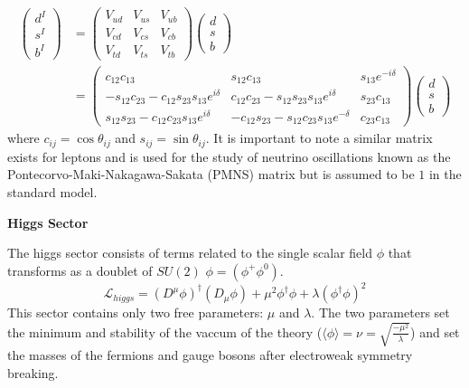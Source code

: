 \begin{align*}
\begin{pmatrix}  d^I \\ s^I \\ b^I \end{pmatrix} &=
 \begin{pmatrix} V_{ud} & V_{us} & V_{ub} \\ V_{cd} & V_{cs} & V_{cb} \\ V_{td} & V_{ts} & V_{tb} \end{pmatrix} 
\begin{pmatrix}  d \\ s \\ b \end{pmatrix}  \\
&= \begin{pmatrix} c_{12}c_{13} & s_{12} c_{13} & s_{13} e^{-i\delta} \\ 
-s_{12}c_{23} - c_{12}s_{23}s_{13}e^{i\delta} & c_{12} c_{23} - s_{12} s_{23} s_{13} e^{i\delta} & s_{23} c_{13} \\
s_{12}s_{23} - c_{12} c_{23} s_{13} e^{i\delta} & -c_{12}s_{23}-s_{12}c_{23}s_{13}e^{-\delta} & c_{23}c_{13}  \end{pmatrix} 
\begin{pmatrix}  d \\ s \\ b \end{pmatrix} 
\end{align*}
where $c_{ij} = \cos \theta_{ij}$ and $s_{ij} = \sin \theta_{ij}$. It is important to note a similar matrix exists for leptons
and is used for the study of neutrino oscillations known as the Pontecorvo-Maki-Nakagawa-Sakata (PMNS) matrix but is assumed to
be $1$ in the standard model. 

\textbf{Higgs Sector}

The higgs sector consists of terms related to the single scalar field $\phi$ that transforms as a doublet of $SU(2)$
$\phi = (\phi^+ \phi^0)$.  
\begin{equation}
\mathcal{L}_{higgs} = (D^\mu \phi)^\dagger(D_\mu \phi) + \mu^2 \phi^\dagger \phi + \lambda (\phi^\dagger \phi)^2 
\end{equation}
This sector contains only two free parameters: $\mu$ and $\lambda$. The two parameters set the minimum and stability of the vaccum
of the theory ($\langle \phi \rangle =  \nu = \sqrt{\frac{-\mu^2}{\lambda}}$) and set the masses of the fermions and gauge bosons after electroweak symmetry breaking. 

